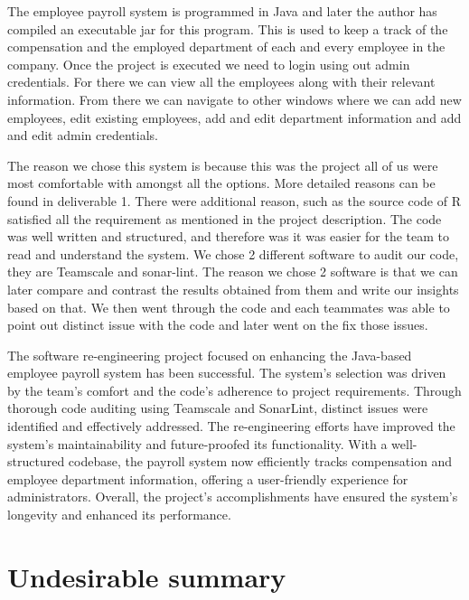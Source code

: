 \documentclass[12pt,english]{article}
\begin{document}
\vspace{0.5cm}

The employee payroll system is programmed in Java and later the author has compiled an executable jar for this program. This is used to keep a track of the compensation and the employed department of each and every employee in the company. Once the project is executed we need to login using out admin credentials. For there we can view all the employees along with their relevant information. From there we can navigate to other windows where we can add new employees, edit existing employees, add and edit department information and add and edit admin credentials. 

\vspace{0.5cm}

The reason we chose this system is because this was the project all of us were most comfortable with amongst all the options. More detailed reasons can be found in deliverable 1. There were additional reason, such as the source code of R satisfied all the requirement as mentioned in the project description. The code was well written and structured, and therefore was it was easier for the team to read and understand the system. We chose 2 different software to audit our code, they are Teamscale and sonar-lint. The reason we chose 2 software is that we can later compare and contrast the results obtained from them and write our insights based on that. We then went through the code and each teammates was able to point out distinct issue with the code and later went on the fix those issues. 

\vspace{0.5cm}

The software re-engineering project focused on enhancing the Java-based employee payroll system has been successful. The system's selection was driven by the team's comfort and the code's adherence to project requirements. Through thorough code auditing using Teamscale and SonarLint, distinct issues were identified and effectively addressed. The re-engineering efforts have improved the system's maintainability and future-proofed its functionality. With a well-structured codebase, the payroll system now efficiently tracks compensation and employee department information, offering a user-friendly experience for administrators. Overall, the project's accomplishments have ensured the system's longevity and enhanced its performance.


\newpage
\section{Undesirable summary}
\end{document}
